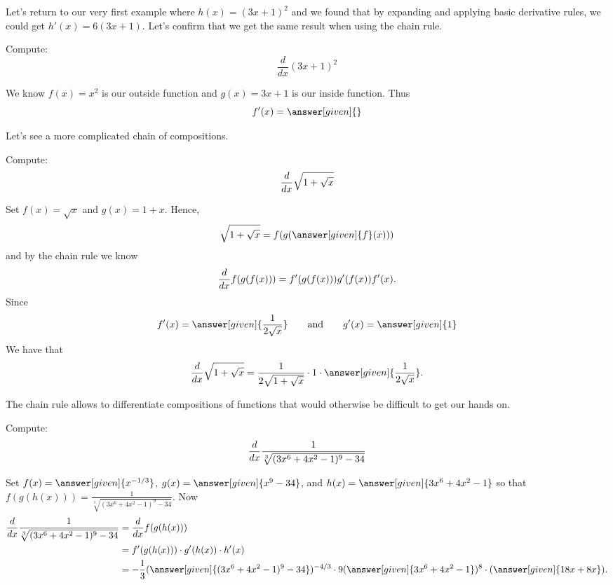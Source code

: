 \documentclass{ximera}
\begin{document}
Let's return to our very first example where $h(x)=(3x+1)^2$ and we found that by expanding and applying basic derivative rules, we could get $h'(x)=6(3x+1)$. Let's confirm that we get the same result when using the chain rule.

\begin{example}
    Compute:
    \[\frac{d}{dx}(3x+1)^2\]
    \begin{explanation}
        We know $f(x) = x^{2}$ is our outside function and $g(x) = 3x+1$ is our inside function. Thus 
        \[f'(x)=\answer[given]{}\]
    \end{explanation}
\end{example}

Let's see a more complicated chain of compositions.

\begin{example}
Compute:
\[
\frac{d}{\mathop{}\!d x} \sqrt{1+\sqrt{x}}
\]

\begin{explanation}
Set 
$f(x)=\sqrt{x}$ and $g(x)=1+x$. Hence,
\[
\sqrt{1+\sqrt{x}}=f(g(\answer[given]{f}(x)))
\]
and by the chain rule we know
\[
\frac{d}{\mathop{}\!d x} f(g(f(x))) = f'(g(f(x)))g'(f(x))f'(x).
\]
Since 
\[
f'(x) = \answer[given]{\frac{1}{2\sqrt{x}}} \qquad\text{and}\qquad g'(x) = \answer[given]{1}
\]
We have that
\[
\ddx \sqrt{1+\sqrt{x}} = \frac{1}{2\sqrt{1+\sqrt{x}}}\cdot 1\cdot  \answer[given]{\frac{1}{2\sqrt{x}}}.
\]
\end{explanation}
\end{example}

The chain rule allows to differentiate compositions of functions that
would otherwise be difficult to get our hands on.

\begin{example}
Compute:
\[
\frac{d}{\mathop{}\!d x} \frac{1}{\sqrt[3]{(3x^6+4x^2-1)^{9}-34}}
\]

\begin{explanation}
Set $f(x) = \answer[given]{x^{-1/3}}$, $g(x) = \answer[given]{x^9-34}$, and $h(x) = \answer[given]{3x^6+4x^2-1}$
so that $f(g(h(x))) = \frac{1}{\sqrt[3]{(3x^6+4x^2-1)^{9}-34}}$. Now
\begin{align*}
  \ddx \frac{1}{\sqrt[3]{(3x^6+4x^2-1)^{9}-34}} &= \ddx f(g(h(x)))\\
  &= f'(g(h(x))) \cdot g'(h(x)) \cdot h'(x)\\
  &= -\frac{1}{3}({\answer[given]{(3x^6+4x^2-1)^{9}-34}})^{-4/3} \cdot 9(\answer[given]{3x^6+4x^2-1})^{8} \cdot (\answer[given]{18x+8x}).
\end{align*}
\end{explanation}
\end{example}
\end{document}
